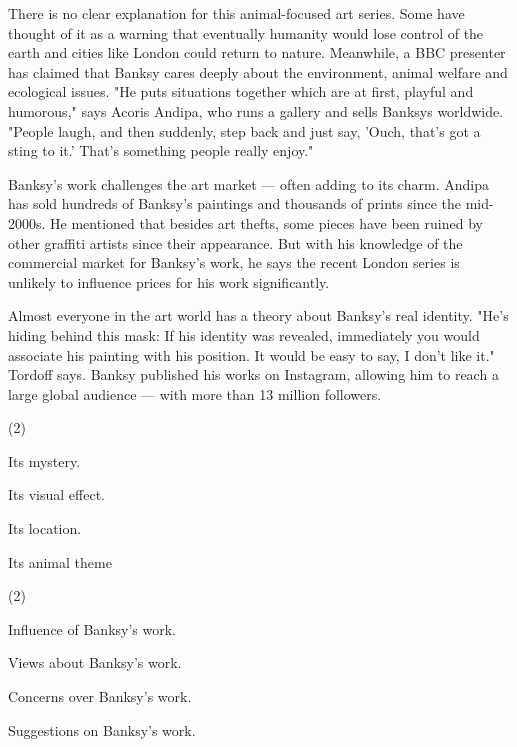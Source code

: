\documentclass{英语试卷}
\begin{document}
\par There is no clear explanation for this animal-focused art series. Some have thought of it as a warning that eventually humanity would lose control of the earth and cities like London could return to nature. Meanwhile, a BBC presenter has claimed that Banksy cares deeply about the environment, animal welfare and ecological issues. "He puts situations together which are at first, playful and humorous," says Acoris Andipa, who runs a gallery and sells Banksys worldwide. "People laugh, and then suddenly, step back and just say, 'Ouch, that's got a sting to it.' That's something people really enjoy."\par
\par Banksy's work challenges the art market — often adding to its charm. Andipa has sold hundreds of Banksy's paintings and thousands of prints since the mid-2000s. He mentioned that besides art thefts, some pieces have been ruined by other graffiti artists since their appearance. But with his knowledge of the commercial market for Banksy's work, he says the recent London series is unlikely to influence prices for his work significantly.\par
\par Almost everyone in the art world has a theory about Banksy's real identity. "He's hiding behind this mask: If his identity was revealed, immediately you would associate his painting with his position. It would be easy to say, I don't like it." Tordoff says. Banksy published his works on Instagram, allowing him to reach a large global audience — with more than 13 million followers.\par
{}
\begin{choices}(2)
  \item Its mystery.
  \item Its visual effect.
  \item Its location.
  \item Its animal theme
\end{choices}
\begin{choices}(2)
  \item Influence of Banksy's work.
  \item Views about Banksy's work.
  \item Concerns over Banksy's work.
  \item Suggestions on Banksy's work.
\end{choices}
\end{document}

